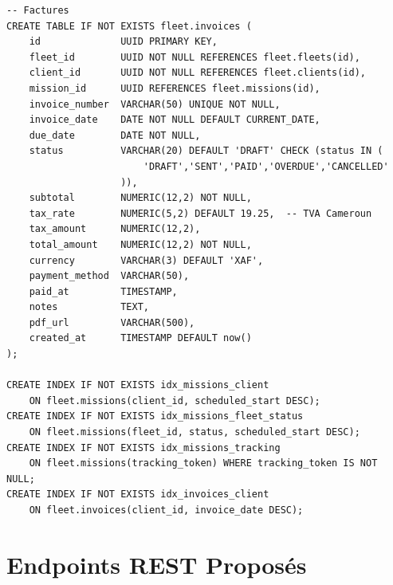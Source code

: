 \documentclass[12pt,a4paper]{report}
\begin{document}
\begin{lstlisting}[style=sqlStyle, caption={Tables du module Clients et Missions}]
-- Factures
CREATE TABLE IF NOT EXISTS fleet.invoices (
    id              UUID PRIMARY KEY,
    fleet_id        UUID NOT NULL REFERENCES fleet.fleets(id),
    client_id       UUID NOT NULL REFERENCES fleet.clients(id),
    mission_id      UUID REFERENCES fleet.missions(id),
    invoice_number  VARCHAR(50) UNIQUE NOT NULL,
    invoice_date    DATE NOT NULL DEFAULT CURRENT_DATE,
    due_date        DATE NOT NULL,
    status          VARCHAR(20) DEFAULT 'DRAFT' CHECK (status IN (
                        'DRAFT','SENT','PAID','OVERDUE','CANCELLED'
                    )),
    subtotal        NUMERIC(12,2) NOT NULL,
    tax_rate        NUMERIC(5,2) DEFAULT 19.25,  -- TVA Cameroun
    tax_amount      NUMERIC(12,2),
    total_amount    NUMERIC(12,2) NOT NULL,
    currency        VARCHAR(3) DEFAULT 'XAF',
    payment_method  VARCHAR(50),
    paid_at         TIMESTAMP,
    notes           TEXT,
    pdf_url         VARCHAR(500),
    created_at      TIMESTAMP DEFAULT now()
);

CREATE INDEX IF NOT EXISTS idx_missions_client
    ON fleet.missions(client_id, scheduled_start DESC);
CREATE INDEX IF NOT EXISTS idx_missions_fleet_status
    ON fleet.missions(fleet_id, status, scheduled_start DESC);
CREATE INDEX IF NOT EXISTS idx_missions_tracking
    ON fleet.missions(tracking_token) WHERE tracking_token IS NOT NULL;
CREATE INDEX IF NOT EXISTS idx_invoices_client
    ON fleet.invoices(client_id, invoice_date DESC);
\end{lstlisting}

\section{Endpoints REST Proposés}
\end{document}
